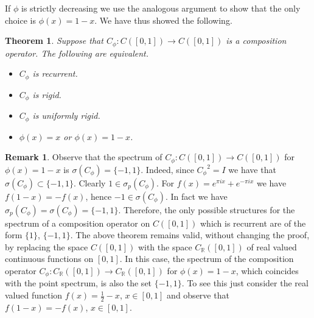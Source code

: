 \documentclass[12pt,leqno]{amsart}
\theoremstyle{plain}
\newtheorem{theorem}[equation]{Theorem}
\theoremstyle{definition}
\newtheorem{remark}[equation]{Remark}
\numberwithin{equation}{section}
\begin{document}
If $\phi$ is strictly decreasing we use the analogous argument to show that the only choice is $\phi(x)=1-x$. We have thus showed the following. 

\begin{theorem}
	\label{t.compcont} Suppose that $C_\phi:C([0,1])\to C([0,1])$ is a composition operator. The following are equivalent. 
	\begin{itemize}
		\item[(i)] $C_{\phi}$ is recurrent. 
		\item[(ii)] $C_{\phi }$ is rigid. 
		\item[(iii)] $C_{\phi}$ is uniformly rigid. 
		\item[(iv)]$\phi(x)=x$ or $\phi(x)=1-x$. 
	\end{itemize}
\end{theorem}

\begin{remark}
	Observe that the spectrum of $C_\phi:C([0,1])\to C([0,1])$ for $\phi(x)=1-x$ is $\sigma (C_\phi )=\{ -1, 1\}$. Indeed, since ${C_\phi}^2=I$ we have that $\sigma (C_\phi ) \subset \{ -1, 1\}$. Clearly $1\in \sigma_p (C_\phi )$. For $f(x)=e^{\pi ix}+e^{-\pi ix}$ we have $f(1-x)=-f(x)$, hence $-1\in \sigma (C_\phi )$. In fact we have $\sigma_p(C_\phi )=\sigma (C_\phi )=\{ -1,1\}$. Therefore, the only possible structures for the spectrum of a composition operator on $C([0,1])$ which is recurrent are of the form $\{ 1\}$, $\{ -1,1\}$. The above theorem remains valid, without changing the proof, by replacing the space $C([0,1])$ with the space $C_{\mathbb R}([0,1])$ of real valued continuous functions on $[0,1]$. In this case, the spectrum of the composition operator $C_\phi:C_{\mathbb R}([0,1])\to C_{\mathbb R}([0,1])$ for $\phi(x)=1-x$, which coincides with the point spectrum, is also the set $\{ -1, 1\}$. To see this just consider the real valued function $f(x)=\frac{1}{2}-x$, $x\in [0,1]$ and observe that $f(1-x)=-f(x)$, $x\in [0,1]$. 
\end{remark}
\end{document}
